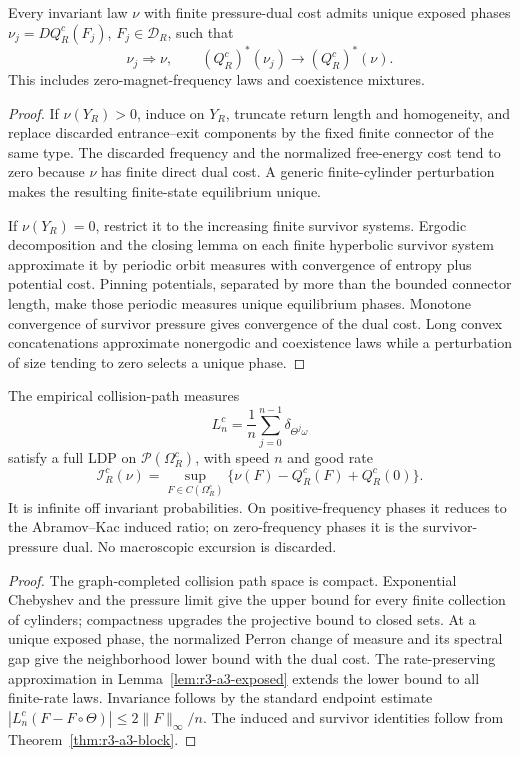 \begin{lemma}
\label{lem:r3-a3-exposed}
Every invariant law \(\nu\) with finite pressure-dual cost admits unique
exposed phases \(\nu_j=DQ_R^c(F_j)\), \(F_j\in\mathscr D_R\), such that
\[
 \nu_j\Rightarrow\nu,
 \qquad
 (Q_R^c)^*(\nu_j)\to(Q_R^c)^*(\nu).
\]
This includes zero-magnet-frequency laws and coexistence mixtures.
\end{lemma}

\begin{proof}
If \(\nu(Y_R)>0\), induce on \(Y_R\), truncate return length and homogeneity,
and replace discarded entrance--exit components by the fixed finite connector
of the same type.  The discarded frequency and the normalized free-energy
cost tend to zero because \(\nu\) has finite direct dual cost.  A generic
finite-cylinder perturbation makes the resulting finite-state equilibrium
unique.

If \(\nu(Y_R)=0\), restrict it to the increasing finite survivor systems.
Ergodic decomposition and the closing lemma on each finite hyperbolic survivor
system approximate it by periodic orbit measures with convergence of entropy
plus potential cost.  Pinning potentials, separated by more than the bounded
connector length, make those periodic measures unique equilibrium phases.
Monotone convergence of survivor pressure gives convergence of the dual cost.
Long convex concatenations approximate nonergodic and coexistence laws while
a perturbation of size tending to zero selects a unique phase.
\end{proof}

\begin{theorem}
\label{thm:r3-a3-collision-ldp}
The empirical collision-path measures
\[
 L_n^c=\frac1n\sum_{j=0}^{n-1}\delta_{\Theta^j\omega}
\]
satisfy a full LDP on \(\mathcal P(\Omega_R^c)\), with speed \(n\) and good
rate
\[
 \boxed{
 \mathcal I_R^c(\nu)=
 \sup_{F\in C(\Omega_R^c)}
 \{\nu(F)-Q_R^c(F)+Q_R^c(0)\}.}
\]
It is infinite off invariant probabilities.  On positive-frequency phases it
reduces to the Abramov--Kac induced ratio; on zero-frequency phases it is the
survivor-pressure dual.  No macroscopic excursion is discarded.
\end{theorem}

\begin{proof}
The graph-completed collision path space is compact.  Exponential Chebyshev
and the pressure limit give the upper bound for every finite collection of
cylinders; compactness upgrades the projective bound to closed sets.  At a
unique exposed phase, the normalized Perron change of measure and its spectral
gap give the neighborhood lower bound with the dual cost.  The
rate-preserving approximation in Lemma~\ref{lem:r3-a3-exposed} extends the
lower bound to all finite-rate laws.  Invariance follows by the standard
endpoint estimate
\(|L_n^c(F-F\circ\Theta)|\le2\|F\|_\infty/n\).  The induced and survivor
identities follow from Theorem~\ref{thm:r3-a3-block}.
\end{proof}

